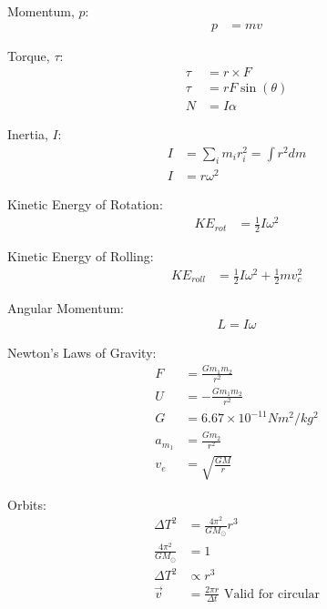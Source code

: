 \documentclass[10pt, letterpaper]{book}
\begin{document}
\begin{multicols*}{2}
        Momentum, $p$:
        \begin{align}
            p    & = mv
        \end{align}

        Torque, $\tau$:
        \begin{align}
            \tau & = r \times F     \\
            \tau & = rF\sin(\theta) \\
            N    & = I\alpha        
        \end{align}

        Inertia, $I$:
        \begin{align}
            I   & = \sum_{i}m_{i}r_{i}^{2} = \int r^{2}dm   \\
            I   & = r\omega^{2}
        \end{align}

        Kinetic Energy of Rotation:
        \begin{align}
            KE_{rot}  & = \frac{1}{2}I\omega^{2}
        \end{align}

        Kinetic Energy of Rolling:
        \begin{align}
            KE_{roll} & = \frac{1}{2}I\omega^{2} + \frac{1}{2}mv_{c}^{2}    
        \end{align}

        Angular Momentum:
        \begin{align}
            L = I\omega
        \end{align}

        Newton's Laws of Gravity:
        \begin{align}
            F   & = \frac{Gm_{1}m_{2}}{r^{2}}           \\
            U   & = -\frac{Gm_{1}m_{2}}{r^{2}}          \\
            G   & = 6.67 \times 10^{-11}Nm^{2}/kg^{2}   \\
            a_{m_{1}}   & = \frac{Gm_{2}}{r^{2}}        \\
            v_{e}   & = \sqrt{\frac{GM}{r}}
        \end{align}

        Orbits:
        \begin{align}
            \Delta T^{2}   & = \frac{4\pi^{2}}{GM_{\odot}}r^{3} \\
            \frac{4\pi^{2}}{GM_{\odot}} & = 1                   \\
            \Delta T^{2} & \propto r^{3}                        \\
            \vec{v} & = \frac{2\pi r}{\Delta t} 
            \text{ Valid for circular}                    
        \end{align}


\end{multicols*}
\end{document}
